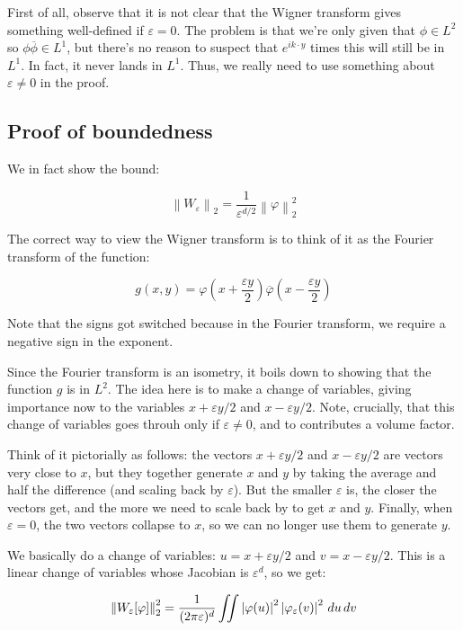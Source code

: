 \documentclass[a4paper]{amsart}
\newcommand{\norm}[1]{\left\|#1\right\|}
\begin{document}
First of all, observe that it is not clear that the Wigner transform
gives something well-defined if $\varepsilon = 0$. The problem is that
we're only given that $\phi \in L^2$ so $\phi \overline{\phi} \in
L^1$, but there's no reason to suspect that $e^{ik \cdot y}$ times
this will still be in $L^1$. In fact, it never lands in $L^1$. Thus, we really
need to use something about $\varepsilon \ne 0$ in the proof.

\subsection{Proof of boundedness}

We in fact show the bound:

$$\norm{W_\varepsilon}_2 = \frac{1}{\varepsilon^{d/2}} \norm{\varphi}_2^2$$

The correct way to view the Wigner transform is to think of it as the Fourier transform
of the function:

$$g(x,y) = \varphi\left(x + \frac{\varepsilon y}{2}\right) \overline{\varphi}\left(x - \frac{\varepsilon y}{2}\right)$$

Note that the signs got switched because in the Fourier transform, we
require a negative sign in the exponent.

Since the Fourier transform is an isometry, it boils down to showing
that the function $g$ is in $L^2$. The idea here is to make a change
of variables, giving importance now to the variables $x + \varepsilon
y/2$ and $x - \varepsilon y/2$. Note, crucially, that this change of
variables goes throuh only if $\varepsilon \ne 0$, and to contributes
a volume factor.

Think of it pictorially as follows: the vectors $x + \varepsilon y/2$
and $x - \varepsilon y/2$ are vectors very close to $x$, but they
together generate $x$ and $y$ by taking the average and half the
difference (and scaling back by $\varepsilon$). But the smaller
$\varepsilon$ is, the closer the vectors get, and the more we need to
scale back by to get $x$ and $y$. Finally, when $\varepsilon = 0$, the
two vectors collapse to $x$, so we can no longer use them to generate $y$.

We basically do a change of variables: $u = x + \varepsilon y/2$ and $v =
x - \varepsilon y/2$. This is a linear change of variables whose
Jacobian is $\varepsilon^d$, so we get:

$$\norm{W_\varepsilon[\varphi]}_2^2 = \frac{1}{(2\pi \varepsilon)^d}\iint \abs{\varphi(u)}^2 \abs{\varphi_\varepsilon(v)}^2 \, du \, dv$$
\end{document}
